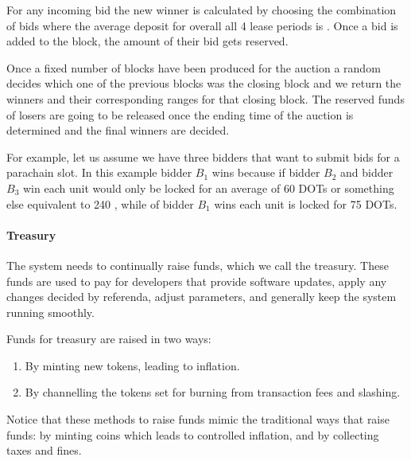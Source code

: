 For any incoming bid\eray{}{,} the new winner is calculated by choosing the combination of bids\eray{}{,} where the average deposit for overall all 4 lease periods is .
Once a bid is added to the block, the amount of their bid gets reserved.

Once a fixed number of blocks have been produced for the auction\eray{}{,} a random  decides which one of the previous blocks was the closing block\eray{}{,} and we return the winners and their corresponding ranges for that closing block.
The reserved funds of losers are going to be released once the ending time of the auction is determined\eray{}{,} and the final winners are decided.

For example, let us assume we have three bidders that want to submit bids for a parachain slot.
In this example bidder $B_1$ wins because if bidder $B_2$ and bidder $B_3$ win each unit would only be locked for an average of 60 DOTs or something else equivalent to 240 , while of bidder $B_1$ wins each unit is locked for 75 DOTs.

 \paragraph{Treasury\eray{}{:}}

 The system needs to continually raise funds, which we call the treasury.
 These funds are used to pay for developers that provide software updates, apply any changes decided by referenda, adjust parameters, and generally keep the system running smoothly.

Funds for treasury are raised in two ways:

{
\begin{enumerate}
\item By minting new tokens, leading to inflation.
\item By channelling the tokens set for burning from transaction fees and slashing.
\end{enumerate}
}

 
Notice that these methods to raise funds mimic the traditional ways that  raise funds: by minting coins which leads to controlled inflation, and by collecting taxes and fines.

